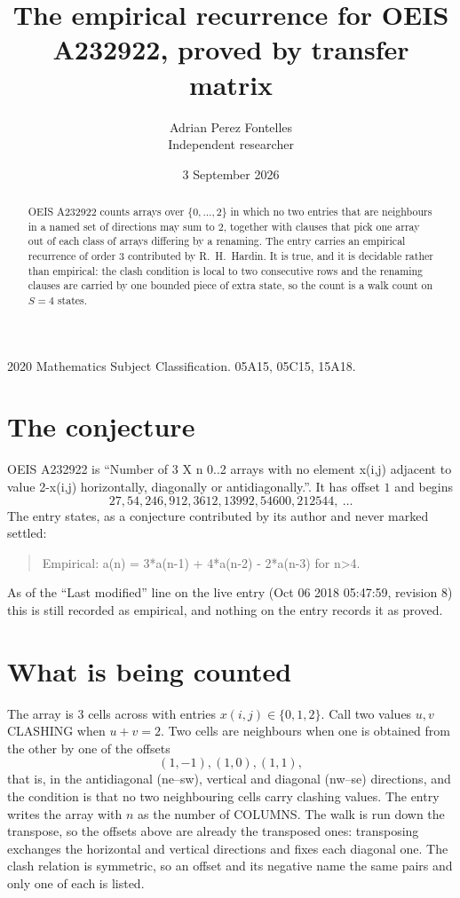\documentclass[11pt,a4paper]{article}
\title{The empirical recurrence for OEIS A232922, proved by transfer matrix}
\author{Adrian Perez Fontelles\\ \small Independent researcher}
\date{3 September 2026}
\theoremstyle{plain}
\theoremstyle{definition}
\begin{document}
\maketitle

\begin{abstract}
OEIS A232922 counts arrays over $\{0,\dots,2\}$ in which no two entries that are neighbours in
a named set of directions may sum to $2$, together with clauses that pick one array out of
each class of arrays differing by a renaming. The entry carries an empirical recurrence of
order $3$ contributed by R.~H.~Hardin. It is true, and it is decidable rather than
empirical: the clash condition is local to two consecutive rows and the renaming clauses are
carried by one bounded piece of extra state, so the count is a walk count on $S=4$ states.
\end{abstract}

\noindent\small 2020 Mathematics Subject Classification. 05A15, 05C15, 15A18.\normalsize

\section{The conjecture}

OEIS A232922 is ``Number of 3 X n 0..2 arrays with no element x(i,j) adjacent to value 2-x(i,j) horizontally, diagonally or antidiagonally.''. It has offset $1$ and begins
\[
27, 54, 246, 912, 3612, 13992, 54600, 212544,\ \dots
\]
The entry states, as a conjecture contributed by its author and never marked settled:
\begin{quote}
Empirical: a(n) = 3*a(n-1) + 4*a(n-2) - 2*a(n-3) for n>4.
\end{quote}
As of the ``Last modified'' line on the live entry (Oct 06 2018 05:47:59, revision 8) this is still
recorded as empirical, and nothing on the entry records it as proved.

\section{What is being counted}

The array is $3$ cells across with entries $x(i,j)\in\{0,1,2\}$. Call two values $u,v$ CLASHING
when $u+v=2$. Two cells are neighbours when one is obtained from the other by one of
the offsets
\[
(1,-1), (1,0), (1,1),
\]
that is, in the antidiagonal (ne--sw), vertical and diagonal (nw--se) directions, and the condition is that no two neighbouring cells carry
clashing values. The entry writes the array with $n$ as the number of COLUMNS. The walk is run down the transpose, so the offsets above are already the transposed ones: transposing exchanges the horizontal and vertical directions and fixes each diagonal one. The clash relation is symmetric, so an offset and its negative name the
same pairs and only one of each is listed.
\end{document}
